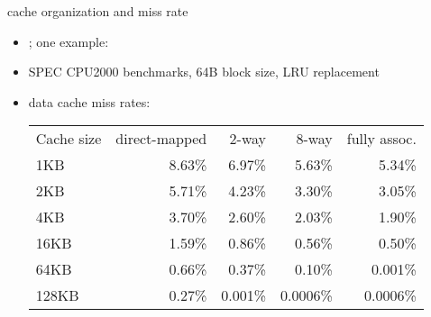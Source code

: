 \usetikzlibrary{calc}

\begin{frame}{cache organization and miss rate}
\begin{itemize}
\item {}; one example:
\item SPEC CPU2000 benchmarks, 64B block size, LRU replacement
\item data cache miss rates:
{\small
\begin{tabular}{lrrrr}
Cache size & direct-mapped & 2-way & 8-way & fully assoc. \\
1KB & 8.63\% & 6.97\% & 5.63\% & 5.34\% \\
2KB & 5.71\% & 4.23\% & 3.30\% & 3.05\% \\
4KB & 3.70\% & 2.60\% & {2.03\%} & {1.90\%} \\
16KB & 1.59\% & 0.86\% & 0.56\% & 0.50\% \\
64KB & 0.66\% & 0.37\% & 0.10\% & 0.001\% \\
128KB & 0.27\% & 0.001\% & 0.0006\% & 0.0006\% \\
\end{tabular}
}
\end{itemize}
\end{frame}

